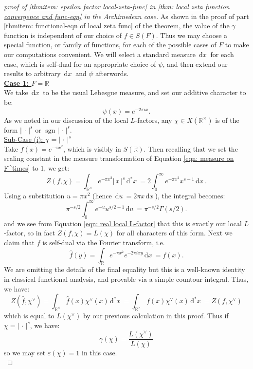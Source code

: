 \documentclass[11pt, x11names]{book}
\newcommand{\rr}{\mathbb{R}}
\newcommand{\abs}[1]{\left| \, #1  \,\right|}
\renewcommand{\hat}{\widehat}
\DeclareMathOperator{\sgn}{sgn}
\newcommand{\du}{\, \mathrm{d}u \ }
\newcommand{\dx}{\, \mathrm{d}x \ }
\renewcommand{\d}[1]{\, \mathrm{d}#1 \ }
\begin{document}
\begin{proof}[proof of \ref{thmitem: epsilon factor local-zeta-func} in \ref{thm: local zeta function convergence and func-eqn} in the Archimedean case]
As shown in the proof of part \ref{thmitem: functional-eqn of local zeta func} of the theorem, the value of the $\gamma$ function is independent of our choice of $f \in S(F)$. Thus we may choose a special function, or family of functions, for each of the possible cases of $F$ to make our computations convenient. We will select a standard measure $\dx$ for each case, which is self-dual for an appropriate choice of $\psi$, and then extend our results to arbitrary $\dx$ and $\psi$ afterwords.\\

\textbf{\underline{Case 1: $F = \rr$}}\\
We take $\dx$ to be the usual Lebesgue measure, and set our additive character to be:
\begin{equation*}
    \psi(x) = e^{- 2 \pi i x}.
\end{equation*}
As we noted in our discussion of the local $L$-factors, any $\chi \in X(\rr^\times)$ is of the form $\abs{\cdot}^s$ or $\sgn \abs{\cdot}^s$.\\

\underline{Sub-Case (i): $\chi = \abs{\cdot}^s$}\\
Take $f(x) = e^{- \pi x^2}$, which is visibly in $S(\rr)$. Then recalling that we set the scaling constant in the measure transformation of Equation \ref{eqn: measure on F^times} to 1, we get:
\begin{equation*}
    Z(f, \chi) = \int_{\rr^\times} e^{-\pi x^2} \abs{x}^s \d{^*x} = 2 \int^\infty_0 e^{-\pi x^2} x^{s-1} \dx.
\end{equation*}
Using a substitution $u = \pi x^2$ (hence $\du = 2 \pi x \dx$),  the integral becomes:
\begin{equation*}
    \pi^{-s/2} \int^\infty_0 e^{-u} u^{s/2 - 1} \du = \pi^{-s/2} \Gamma(s/2).
\end{equation*}
and we see from Equation \ref{eqn: real local L-factor} that this is exactly our local $L$-factor, so in fact $Z(f, \chi) = L(\chi)$ for all characters of this form. Next we claim that $f$ is self-dual via the Fourier transform, i.e.
\begin{equation*}
    \hat{f}(y) = \int_\rr e^{-\pi x^2} e^{-2 \pi i xy} \dx = f(x).
\end{equation*}
We are omitting the details of the final equality but this is a well-known identity in classical functional analysis, and provable via a simple countour integral. Thus, we have:
\begin{equation*}
    Z(\hat{f}, \chi^\lor) = \int_{\rr^\times} \hat{f}(x) \chi^\lor(x) \d{^*x} = \int_{\rr^\times} f(x) \chi^\lor(x) \d{^*x} = Z(f, \chi^\lor)
\end{equation*}
which is equal to $L(\chi^\lor)$ by our previous calculation in this proof. Thus if $\chi = \abs{\cdot}^s$, we have:
\begin{equation*}
    \gamma(\chi) = \frac{L(\chi^\lor)}{L(\chi)}
\end{equation*}
so we may set $\varepsilon(\chi) = 1$ in this case.\\


\end{proof}
\end{document}
